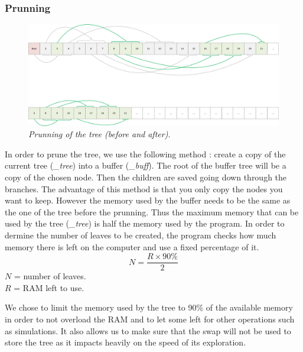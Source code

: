 \subsubsection{Prunning}
\begin{figure}[H] 
\centerline{\includegraphics[width=\textwidth]{Data_Structure/Img/array.png}}
\caption{\label{fig:arrayprunning}\textit{Prunning of the tree (before and after)}.}
\end{figure}
In order to prune the tree, we use the following method : create a copy of the current tree (\textit{\_tree}) into a buffer (\textit{\_buff}). The root of the buffer tree will be a copy of the chosen node. Then the children are saved going down through the branches. The advantage of this method is that you only copy the nodes you want to keep. However the memory used by the buffer needs to be the same as the one of the tree before the prunning. Thus the maximum memory that can be used by the tree (\textit{\_tree}) is half the memory used by the program. In order to dermine the number of leaves to be created, the program checks how much memory there is left on the computer and use a fixed percentage of it.
\begin{equation}
N = \frac{R \times 90\%}{2}
\end{equation}
\ensuremath{N} = number of leaves.\\
\ensuremath{R} = RAM left to use.

We chose to limit the memory used by the tree to 90\% of the available memory in order to not overload the RAM and to let some left for other operations such as simulations. It also allows us to make sure that the swap will not be used to store the tree as it impacts heavily on the speed of its exploration.


